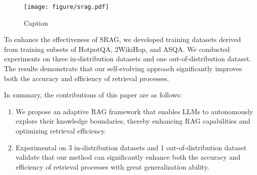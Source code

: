 

\begin{figure*}[htbp]
    \centering
    \texttt{[image: figure/srag.pdf]}
    \caption{Caption}
    \label{fig:srag}
\end{figure*}



To enhance the effectiveness of SRAG, we developed training datasets derived from training subsets of HotpotQA, 2WikiHop, and ASQA. We conducted experiments on three in-distribution datasets and one out-of-distribution dataset. The results demonstrate that our self-evolving approach significantly improves both the accuracy and efficiency of retrieval processes.


In summary, the contributions of this paper are as follows:
\begin{enumerate}
    \item We propose an adaptive RAG framework that enables LLMs to autonomously explore their knowledge boundaries, thereby enhancing RAG capabilities and optimizing retrieval efficiency.
    \item Experimental on 3 in-distribution datasets and 1 out-of-distribution dataset validate that our method can significantly enhance both the accuracy and efficiency of retrieval processes with great generalization ability.
\end{enumerate}

